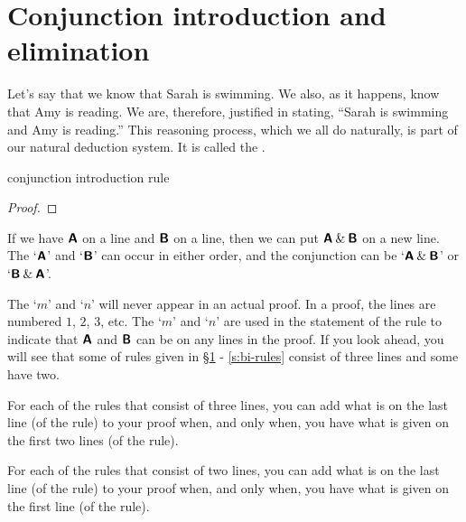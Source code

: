 \section{Conjunction introduction and elimination}\label{s:conj-rule}

Let's say that we know that Sarah is swimming. We also, as it happens, know that Amy is reading. We are, therefore, justified in stating, ``Sarah is swimming and Amy is reading.'' 
This reasoning process, which we all do naturally, is part of our natural deduction system. It is called the . 
\begin{factboxy}{conjunction introduction rule}
\begin{proof}
	 
\end{proof}

\small{If we have $\bm{\mathsf{A}}$ on a line and $\bm{\mathsf{B}}$ on a line, then we can put $\bm{\mathsf{A}}\mathbin{\&}\bm{\mathsf{B}}$ on a new line. The `$\bm{\mathsf{A}}$' and `$\bm{\mathsf{B}}$' can occur in either order, and the conjunction can be `$\bm{\mathsf{A}} \mathbin{\&} \bm{\mathsf{B}}$' or `$\bm{\mathsf{B}} \mathbin{\&} \bm{\mathsf{A}}$'.}
\end{factboxy}


The `$m$' and `$n$' will never appear in an actual proof. In a proof, the lines are numbered $1$, $2$, $3$, etc.  The `$m$' and `$n$' are used in the statement of the rule to indicate that $\bm{\mathsf{A}}$ and $\bm{\mathsf{B}}$ can be on any lines in the proof.
If you look ahead, you will see that some of rules given in \S \ref{s:conj-rule} - \ref{s:bi-rules} consist of three lines and some have two. 
\begin{earg}
\item[(a)] For each of the rules that consist of three lines, you can add what is on the last line (of the rule) to your proof when, and only when, you have what is given on the first two lines (of the rule).
\item[(b)] For each of the rules that consist of two lines, you can add what is on the last line (of the rule) to your proof when, and only when, you have what is given on the first line (of the rule).
\end{earg}

